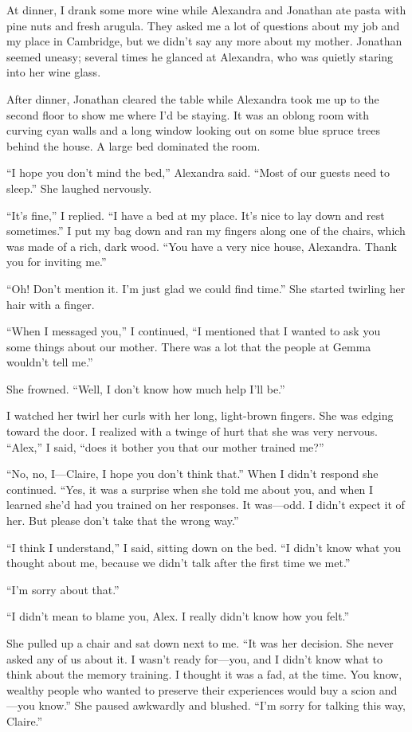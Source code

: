 \documentclass[10pt,b5paper]{article}
\begin{document}
At dinner, I drank some more wine while Alexandra and Jonathan
ate pasta with pine nuts and fresh arugula. They asked me a lot of
questions about my job and my place in Cambridge, but we didn't say
any more about my mother. Jonathan seemed uneasy; several times he
glanced at Alexandra, who was quietly staring into her wine glass.

After dinner, Jonathan cleared the table while Alexandra took me up to
the second floor to show me where I'd be staying.  It was an oblong
room with curving cyan walls and a long window looking out on some
blue spruce trees behind the house. A large bed dominated the room.

``I hope you don't mind the bed,'' Alexandra said. ``Most of our
guests need to sleep.'' She laughed nervously.

``It's fine,'' I replied. ``I have a bed at my place. It's nice to
lay down and rest sometimes.'' I put my bag down and ran my fingers
along one of the chairs, which was made of a rich, dark wood. ``You
have a very nice house, Alexandra. Thank you for inviting me.''

``Oh! Don't mention it. I'm just glad we could find time.'' She
started twirling her hair with a finger.

``When I messaged you,'' I continued, ``I mentioned that I wanted to
ask you some things about our mother. There was a lot that the people
at Gemma wouldn't tell me.''

She frowned. ``Well, I don't know how much help I'll be.''

I watched her twirl her curls with her long, light-brown fingers. She
was edging toward the door. I realized with a twinge of hurt that
she was very nervous.  ``Alex,'' I said, ``does it bother you that
our mother trained me?''

``No, no, I---Claire, I hope you don't think that.'' When I didn't
respond she continued. ``Yes, it was a surprise when she told me about
you, and when I learned she'd had you trained on her responses. It
was---odd. I didn't expect it of her. But please don't take that the
wrong way.''

``I think I understand,'' I said, sitting down on the bed. ``I didn't
know what you thought about me, because we didn't talk after the
first time we met.''

``I'm sorry about that.''

``I didn't mean to blame you, Alex. I really didn't know how you
felt.''

She pulled up a chair and sat down next to me. ``It was her decision.
She never asked any of us about it. I wasn't ready for---you, and I
didn't know what to think about the memory training. I thought it was
a fad, at the time. You know, wealthy people who wanted to preserve
their experiences would buy a scion and---you know.''  She paused
awkwardly and blushed. ``I'm sorry for talking this way, Claire.''
\end{document}
